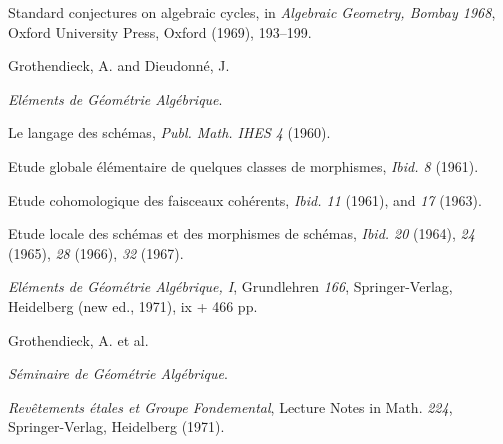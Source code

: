 {\noindent\hangindent=25bp\hspace*{6bp}%
Standard conjectures on algebraic cycles, in \emph{Algebraic Geometry, Bombay 1968}, Oxford University Press, Oxford (1969), 193--199.\par
\par\vspace{2.15pt}\noindent Grothendieck, A. and Dieudonn\'e, J.\par
\noindent\hspace*{12bp}\hypertarget{bib-EGA}{} \emph{El\'ements de G\'eom\'etrie Alg\'ebrique}.\par
\noindent\hangindent=52bp\hspace*{10bp}%
Le langage des sch\'emas, \emph{Publ. Math. IHES 4} (1960).\par
\noindent\hangindent=52bp\hspace*{10bp}%
Etude globale \'el\'ementaire de quelques classes de morphismes, \emph{Ibid. 8} (1961).\par
\noindent\hangindent=52bp\hspace*{10bp}%
Etude cohomologique des faisceaux coh\'erents, \emph{Ibid. 11} (1961), and \emph{17} (1963).\par
\noindent\hangindent=52bp\hspace*{10bp}%
Etude locale des sch\'emas et des morphismes de sch\'emas, \emph{Ibid. 20} (1964), \emph{24} (1965), \emph{28} (1966), \emph{32} (1967).\par
\noindent\hangindent=52bp\hspace*{10bp}%
\emph{El\'ements de G\'eom\'etrie Alg\'ebrique, I}, Grundlehren \emph{166}, Springer-Verlag, Heidelberg (new ed., 1971), ix + 466 pp.\par
\par\vspace{2.15pt}\noindent Grothendieck, A. et al.\par
\noindent\hspace*{12bp}\hypertarget{bib-SGA}{} \emph{S\'eminaire de G\'eom\'etrie Alg\'ebrique}.\par
\noindent\hangindent=52bp\hspace*{10bp}%
\emph{Rev\^etements \'etales et Groupe Fondemental}, Lecture Notes in Math. \emph{224}, Springer-Verlag, Heidelberg (1971).\par
}
